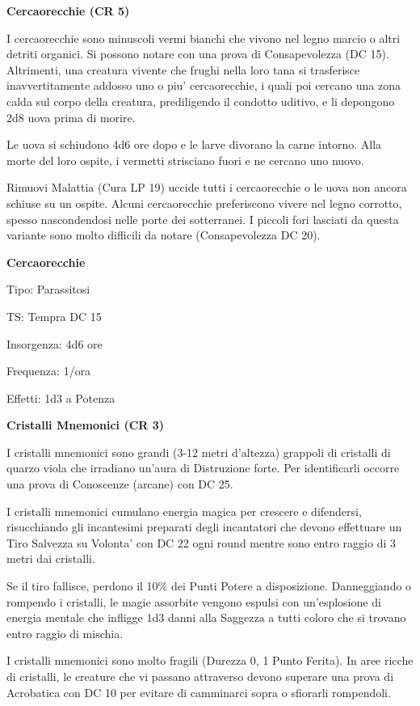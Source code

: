 \documentclass[a4paper,11pt,twoside,openany]{book}
\begin{document}
\textbf{Cercaorecchie (CR 5)}

I cercaorecchie sono minuscoli vermi bianchi che vivono nel legno marcio o altri detriti organici. Si possono notare con una prova di Consapevolezza (DC 15). Altrimenti, una creatura vivente che frughi nella loro tana si trasferisce inavvertitamente addosso uno o piu' cercaorecchie, i quali poi cercano una zona calda sul corpo della creatura, prediligendo il condotto uditivo, e li depongono 2d8 uova prima di morire. 

Le uova si schiudono 4d6 ore dopo e le larve divorano la carne intorno. Alla morte del loro ospite, i vermetti strisciano fuori e ne cercano uno nuovo.

Rimuovi Malattia (Cura LP 19) uccide tutti i cercaorecchie o le uova non ancora schiuse su un ospite. Alcuni cercaorecchie preferiscono vivere nel legno corrotto, spesso nascondendosi nelle porte dei sotterranei. I piccoli fori lasciati da questa variante sono molto difficili da notare (Consapevolezza DC 20).

\textbf{Cercaorecchie}

Tipo: Parassitosi

TS: Tempra DC 15

Insorgenza: 4d6 ore

Frequenza: 1/ora

Effetti: 1d3 a Potenza

\textbf{Cristalli Mnemonici (CR 3)}

I cristalli mnemonici sono grandi (3-12 metri d'altezza) grappoli di cristalli di quarzo viola che irradiano un'aura di Distruzione forte. Per identificarli occorre una prova di Conoscenze (arcane) con DC 25.

I cristalli mnemonici cumulano energia magica per crescere e difendersi, risucchiando gli incantesimi preparati degli incantatori che devono effettuare un Tiro Salvezza su Volonta' con DC 22 ogni round mentre sono entro raggio di 3 metri dai cristalli.

Se il tiro fallisce, perdono il 10\% dei Punti Potere a disposizione. Danneggiando o rompendo i cristalli, le magie assorbite vengono espulsi con un'esplosione di energia mentale che infligge 1d3 danni alla Saggezza a tutti coloro che si trovano entro raggio di mischia.

I cristalli mnemonici sono molto fragili (Durezza 0, 1 Punto Ferita).
In aree ricche di cristalli, le creature che vi passano attraverso devono superare una prova di Acrobatica con DC 10 per evitare di camminarci sopra o sfiorarli rompendoli.
\end{document}
